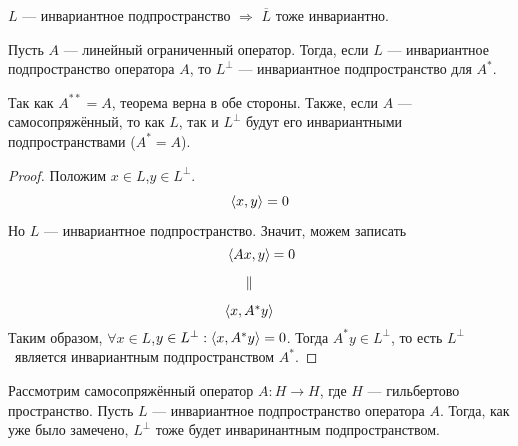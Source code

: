 \documentclass[12pt]{article}
\begin{document}
	\begin{state}
		$L$ --- инвариантное подпространство $\Rightarrow$ $\overline L$ тоже инвариантно.
	\end{state}
	\begin{theorem}
		Пусть $A$ --- линейный ограниченный оператор. Тогда, если $L$ --- инвариантное подпространство оператора $A$, то 
		$L^{\perp}$ --- инвариантное подпространство для $A^*$.
	\end{theorem}
	Так как $A^{**} = A$, теорема верна в обе стороны. Также, если $A$ --- самосопряжённый, то как $L$, так и 
	$L^{\perp}$ будут его инвариантными подпространствами ($A^* = A$).
	\begin{proof}
		Положим $x \in L$,$y \in L^{\perp}$.
		$$\left\langle x, y \right\rangle = 0$$
		Но $L$ --- инвариантное подпространство. Значит, можем записать
		$$
		\begin{CD}
			\scal{Ax}{y} @. = 0 \\
			\parallel \\
			\scal{x}{A^*y}
		\end{CD}
		$$
		Таким образом, $\forall x \in L$,$y \in L^{\perp}: \left\langle x, A^*y \right\rangle = 0$. Тогда $A^*y \in L^{\perp}$, то есть
		$L^{\perp}$~является инвариантным подпространством $A^*$.
	\end{proof}
	
	Рассмотрим самосопряжённый оператор $A:H\rightarrow H$, где $H$ --- гильбертово пространство. Пусть $L$ --- инвариантное 
	подпространство оператора $A$. Тогда, как уже было замечено, $L^{\perp}$ тоже будет инваринантным подпространством.
	
\end{document}
